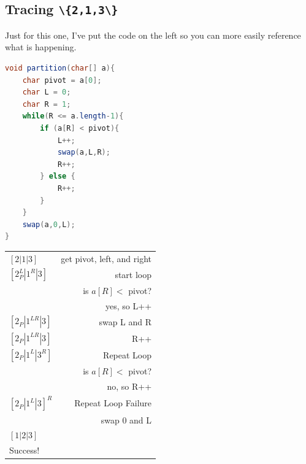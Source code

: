 \documentclass[twoside=false,DIV=14]{scrartcl}
\newcommand{\swaplr}{swap L and R}
\newcommand{\nrpp}{no, so R++}
\newcommand{\ylpp}{yes, so L++}
\newcommand{\isrp}{is $a[R] <$ pivot? }
\begin{document}
\subsection{Tracing \lstinline|\{2,1,3\}|}
Just for this one, I've put the code on the left so you can more easily reference what is happening.
\noindent \begin{minipage}[t]{.5\textwidth}\vspace{0pt}\begin{lstlisting}[language=java] 
void partition(char[] a){
    char pivot = a[0];
    char L = 0;
    char R = 1;
    while(R <= a.length-1){
        if (a[R] < pivot){
            L++;
            swap(a,L,R);
            R++;
        } else {
            R++;
        }
    }
    swap(a,0,L);
}\end{lstlisting}\end{minipage}\begin{minipage}[t]{.5\textwidth} \vspace{0pt}
\begin{tabular}{lr}
    $[2|1|3]$         & get pivot, left, and right \\
    $[2_P^L|1^R|3]$   & start loop \\
                        & \isrp \\
                        & \ylpp \\
    $[2_P|1^{LR}|3]$   & \swaplr \\
    $[2_P|1^{LR}|3]$   & R++ \\
    $[2_P|1^L|3^R]$    & Repeat Loop \\
                       & \isrp \\
                        & \nrpp \\
     $[2_P|1^L|3]^R$    & Repeat Loop Failure \\
                        & swap 0 and L \\
    $[1|2|3]$    &  \\
    Success! & \\
\end{tabular}
\end{minipage}
\end{document}
